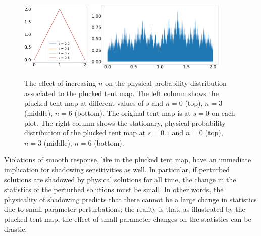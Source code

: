 \documentclass[preprint,12pt]{elsarticle}
\begin{document}
\begin{figure}
    \includegraphics[width=0.3\textwidth,height=1.35in]{osc_tent_6.png}
     \includegraphics[width=0.6\textwidth,height=1.35in]{osc_tent_dens_0.1_6.png}
    \caption{
    The effect of increasing $n$ on the physical probability distribution associated to the plucked tent map. The left column shows the plucked tent map at 
    different values of $s$ and $n = 0$ (top), $n=3$ (middle), $n=6$ (bottom). The original tent map is at $s=0$ on each plot.
    The right column shows the stationary, physical probability distribution of the plucked tent map at $s=0.1$ and $n = 0$ (top), $n=3$ (middle), $n = 6$ (bottom).}
    \label{fig:pluckedTentMap}
\end{figure}


Violations of smooth response, like in the plucked tent map, have an immediate implication for shadowing sensitivities as well. In particular, if perturbed solutions are shadowed by physical solutions for all time, the change in the statistics of the perturbed solutions must be small. In other words, the physicality of shadowing predicts that there cannot be a large change in statistics due to small parameter perturbations; the reality is that, as illustrated by the plucked tent map, the effect of small parameter changes on the statistics can be drastic.  
\end{document}
